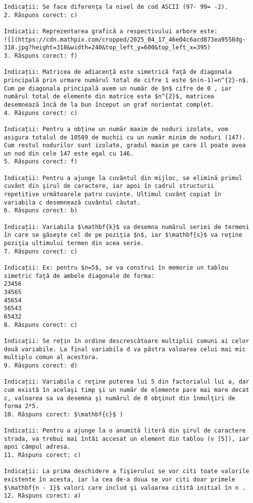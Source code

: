 \begin{verbatim}
Indicații: Se face diferenţa la nivel de cod ASCII (97- 99= -2).
2. Răspuns corect: c)

Indicații: Reprezentarea grafică a respectivului arbore este:
![](https://cdn.mathpix.com/cropped/2025_04_17_46e04c6acd873ea9558dg-318.jpg?height=318&width=240&top_left_y=600&top_left_x=395)
3. Răspuns corect: f)

Indicații: Matricea de adiacență este simetrică faţă de diagonala principală prin urmare numărul total de cifre 1 este $n(n-1)=n^{2}-n$. Cum pe diagonala principală avem un număr de $n$ cifre de 0 , iar numărul total de elemente din matrice este $n^{2}$, matricea desemnează încă de la bun început un graf norientat complet.
4. Răspuns corect: c)

Indicații: Pentru a obține un număr maxim de noduri izolate, vom asigura totalul de 10589 de muchii cu un număr minim de noduri (147). Cum restul nodurilor sunt izolate, gradul maxim pe care îl poate avea un nod din cele 147 este egal cu 146.
5. Răspuns corect: f)

Indicații: Pentru a ajunge la cuvântul din mijloc, se elimină primul cuvânt din şirul de caractere, iar apoi în cadrul structurii repetitive următoarele patru cuvinte. Ultimul cuvânt copiat în variabila c desemnează cuvântul căutat.
6. Răspuns corect: b)

Indicații: Variabila $\mathbf{k}$ va desemna numărul seriei de termeni în care se găseşte cel de pe poziţia $n$, iar $\mathbf{s}$ va reţine poziţia ultimului termen din acea serie.
7. Răspuns corect: c)

Indicații: Ex: pentru $n=5$, se va construi în memorie un tablou simetric faţă de ambele diagonale de forma:
23456
34565
45654
56543
65432
8. Răspuns corect: c)

Indicații: Se rețin în ordine descrescătoare multiplii comuni ai celor două variabile. La final variabila d va păstra valoarea celui mai mic multiplu comun al acestora.
9. Răspuns corect: d)

Indicații: Variabila c reţine puterea lui 5 din factorialul lui a, dar cum există în acelaşi timp şi un număr de elemente pare mai mare decat c, valoarea sa va desemna şi numărul de 0 obţinut din înmulţiri de forma 2*5.
10. Răspuns corect: $\mathbf{c}$ )

Indicații: Pentru a ajunge la o anumită literă din şirul de caractere strada, va trebui mai întâi accesat un element din tablou (v [5]), iar apoi câmpul adresa.
11. Răspuns corect: c)

Indicații: La prima deschidere a fişierului se vor citi toate valorile existente în acesta, iar la cea de-a doua se vor citi doar primele $\mathbf{n - 1}$ valori care includ şi valoarea citită initial în n .
12. Răspuns corect: a)


\end{verbatim}
